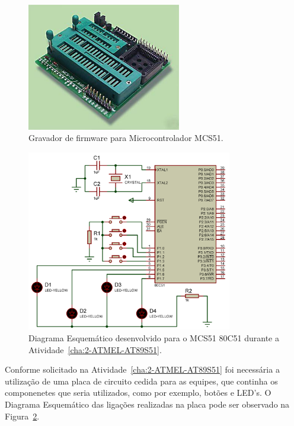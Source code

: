 \documentclass[
	12pt,				%
	openright,			%
  oneside,     %
	a4paper,			%
	english,			%
	french,				%
	spanish,			%
	brazil				%
	]{abntex2}
\begin{document}
\begin{figure}[ht]
  \centering
  \caption{\label{fig:Gravador-Firmware-MCS51}Gravador de firmware para Microcontrolador MCS51.}
  \includegraphics[width=0.6\textwidth]{images/Atividade02/Atividade-02-04-Gravador-MCS-51.jpg}
\end{figure}

\begin{figure}[ht]
  \centering
  \caption{\label{fig:Atividade-02-05-Schematic-01}Diagrama Esquemático desenvolvido para o MCS51 80C51 durante a Atividade~\ref{cha:2-ATMEL-AT89S51}.}
  \includegraphics[width=0.8\textwidth]{images/Atividade02/Atividade-02-05-Schematic-01.png}  
\end{figure}

Conforme solicitado na Atividade~\ref{cha:2-ATMEL-AT89S51} foi necessária a utilização de uma placa de circuito cedida para as equipes, que continha os componenetes que seria utilizados, como por exemplo, botões e LED's. O Diagrama Esquemático das ligações realizadas na placa pode ser observado na Figura~\ref{fig:Atividade-02-05-Schematic-01}.
\end{document}
